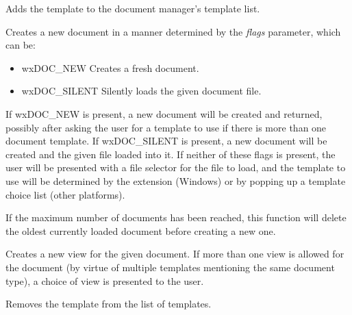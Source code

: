 

Adds the template to the document manager's template list.



Creates a new document in a manner determined by the {\it flags} parameter, which can be:

\begin{itemize}\itemsep=0pt
\item wxDOC\_NEW Creates a fresh document.
\item wxDOC\_SILENT Silently loads the given document file.
\end{itemize}

If wxDOC\_NEW is present, a new document will be created and returned, possibly after
asking the user for a template to use if there is more than one document template.
If wxDOC\_SILENT is present, a new document will be created and the given file loaded
into it. If neither of these flags is present, the user will be presented with
a file selector for the file to load, and the template to use will be determined by the
extension (Windows) or by popping up a template choice list (other platforms).

If the maximum number of documents has been reached, this function
will delete the oldest currently loaded document before creating a new one.



Creates a new view for the given document. If more than one view is allowed for the
document (by virtue of multiple templates mentioning the same document type), a choice
of view is presented to the user.



Removes the template from the list of templates.

\label{wxdocmanagerfilehistoryaddfilestomenu}


